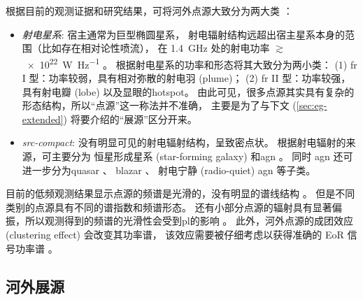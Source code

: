 根据目前的观测证据和研究结果，可将河外点源大致分为两大类 \cite{padovani2016}：
\begin{itemize}
  \item \emph{射电星系}:
    宿主通常为巨型椭圆星系，
    射电辐射结构远超出宿主星系本身的范围（比如存在相对论性喷流），
    在 \SI{1.4}{\GHz} 处的射电功率 $\gtrsim$\,\SI{e22}{\watt\per\hertz}
    \cite{ledlow1996}。
     根据射电星系的功率和形态将其大致分为两小类：
    (1) \ac{fr} I 型：功率较弱，具有相对弥散的射电羽 (plume)；
    (2) \ac{fr} II 型：功率较强，具有射电瓣 (lobe) 以及显眼的\ac{hotspot}。
    由此可见，很多点源其实具有复杂的形态结构，所以\enquote{点源}这一称法并不准确，
    主要是为了与下文 (\autoref{sec:eg-extended})
    将要介绍的\enquote{展源}区分开来。

  \item \emph{\ac{src-compact}}:
    没有明显可见的射电辐射结构，呈致密点状。
    根据射电辐射的来源，可主要分为
    恒星形成星系 (star-forming galaxy) \cite{condon1992}
    和\ac{agn} \cite{urry1995,antonucci1993,padovani2017}。
    同时 \ac{agn} 还可进一步分为\ac{quasar} \cite{barthel1989,antonucci1993}、
    \ac{blazar} \cite{giommi2012,giommi2013}、
    射电宁静 (radio-quiet) \ac{agn} \cite{sandage1965,wilson1995} 等子类。
\end{itemize}

目前的低频观测结果显示点源的频谱是光滑的，没有明显的谱线结构 \cite{offringa2016}。
但是不同类别的点源具有不同的谱指数和频谱形态。
还有小部分点源的辐射具有显著偏振，所以观测得到的频谱的光滑性会受到\ac{pl}的影响
\cite{geil2011,vanEck2018}。
此外，河外点源的成团效应 (clustering effect) 会改变其功率谱，
该效应需要被仔细考虑以获得准确的 EoR 信号功率谱
\cite{diMatteo2002,diMatteo2004,liu2011,alonso2015,murray2017}。

\subsection{河外展源}
\label{sec:eg-extended}

